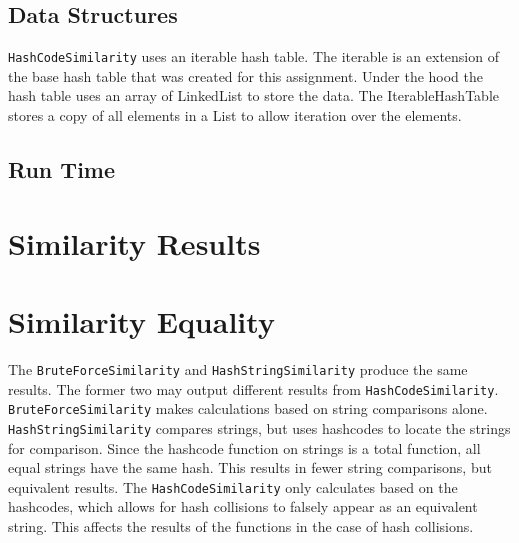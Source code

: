 \documentclass[10pt,letterpaper]{article}
\begin{document}
\subsection{Data Structures}
\texttt{HashCodeSimilarity} uses an iterable hash table. The iterable is an extension of the base hash table that was
created for this assignment. Under the hood the hash table uses an array of LinkedList to store the data. The
IterableHashTable stores a copy of all elements in a List to allow iteration over the elements.
\subsection{Run Time}
\section{Similarity Results}
\section{Similarity Equality}
The \texttt{BruteForceSimilarity} and \texttt{HashStringSimilarity} produce the
same results. The former two may output different results from
\texttt{HashCodeSimilarity}. \texttt{BruteForceSimilarity} makes calculations
based on string comparisons alone. \texttt{HashStringSimilarity} compares
strings, but uses hashcodes to locate the strings for comparison. Since the
hashcode function on strings is a total function, all equal strings have the
same hash. This results in fewer string comparisons, but equivalent results. The
\texttt{HashCodeSimilarity} only calculates based on the hashcodes, which allows
for hash collisions to falsely appear as an equivalent string. This affects the
results of the functions in the case of hash collisions.
\end{document}
